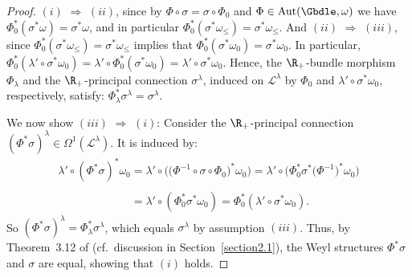 \begin{proof} $(i)$ $\Rightarrow$ $(ii)$, since by $\Phi \circ \sigma = \sigma \circ \Phi_0$ and $\Phi \in \mathrm{Aut}(\Gbdle,\omega)$ we have $\Phi_0^*(\sigma^*\omega) = \sigma^*\omega$, and in particular $\Phi_0^*(\sigma^*\omega_{\leq}) = \sigma^*\omega_{\leq}$. And $(ii)$ $\Rightarrow$ $(iii)$, since $\Phi_0^*(\sigma^*\omega_{\leq}) = \sigma^*\omega_{\leq}$ implies that $\Phi_0^*(\sigma^*\omega_0) = \sigma^*\omega_0$. In particular, $\Phi_0^*(\lambda' \circ \sigma^*\omega_0) = \lambda' \circ \Phi_0^*(\sigma^*\omega_0) = \lambda' \circ \sigma^*\omega_0$. Hence, the $\R_+$-bundle morphism $\Phi_{\lambda}$ and the $\R_+$-principal connection $\sigma^{\lambda}$, induced on $\mathcal{L}^{\lambda}$ by $\Phi_0$ and $\lambda' \circ \sigma^*\omega_0$, respectively, satisfy: $\Phi_{\lambda}^* \sigma^{\lambda} = \sigma^{\lambda}$.

  We now show $(iii)$ $\Rightarrow$ $(i)$: Consider the $\R_+$-principal connection $(\Phi^*\sigma)^{\lambda} \in \Omega^1(\mathcal{L}^{\lambda})$. It is induced by:
\begin{gather*}
\lambda' \circ (\Phi^*\sigma)^*\omega_0  = \lambda' \circ \big(\big(\Phi^{-1}\circ \sigma \circ \Phi_0\big)^*\omega_0\big)
  = \lambda' \circ \big(\Phi_0^*\sigma^*\big(\Phi^{-1}\big)^*\omega_0\big) \\
\phantom{\lambda' \circ (\Phi^*\sigma)^*\omega_0}{} = \lambda' \circ (\Phi_0^*\sigma^*\omega_0) = \Phi_0^*(\lambda' \circ \sigma^*\omega_0).
\end{gather*}
So $(\Phi^*\sigma)^{\lambda} = \Phi_{\lambda}^*\sigma^{\lambda}$, which equals $\sigma^{\lambda}$ by assumption $(iii)$. Thus, by Theorem~3.12 of \cite{CS03} (cf.\ discussion in Section~\ref{section2.1}), the Weyl structures $\Phi^*\sigma$ and $\sigma$ are equal, showing that $(i)$ holds.


\end{proof}
